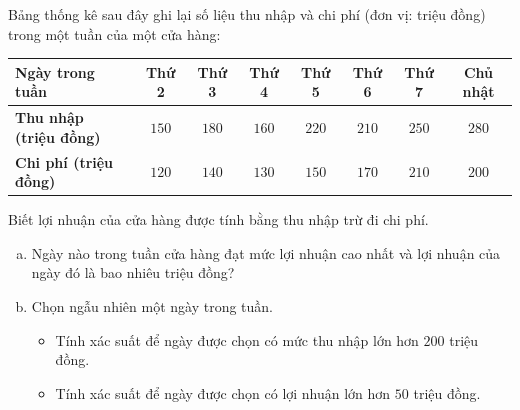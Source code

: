 \begin{bt}%
Bảng thống kê sau đây ghi lại số liệu thu nhập và chi phí (đơn vị: triệu đồng) trong một tuần của một cửa hàng:
\begin{center}
	\begin{tabular}{|l|c|c|c|c|c|c|c|}
		\hline
		\textbf{Ngày trong tuần} & \textbf{Thứ 2} & \textbf{Thứ 3} & \textbf{Thứ 4} & \textbf{Thứ 5} & \textbf{Thứ 6} & \textbf{Thứ 7} & \textbf{Chủ nhật} \\ \hline
		\textbf{Thu nhập (triệu đồng)} & $150$ & $180$ & $160$ & $220$ & $210$ & $250$ & $280$ \\ \hline
		\textbf{Chi phí (triệu đồng)} & $120$ & $140$ & $130$ & $150$ & $170$ & $210$ & $200$ \\ \hline
	\end{tabular}
\end{center}
Biết lợi nhuận của cửa hàng được tính bằng thu nhập trừ đi chi phí.
\begin{enumerate}[a)]
	\item Ngày nào trong tuần cửa hàng đạt mức lợi nhuận cao nhất và lợi nhuận của ngày đó là bao nhiêu triệu đồng?
	\item Chọn ngẫu nhiên một ngày trong tuần.
	\begin{itemize}
		\item Tính xác suất để ngày được chọn có mức thu nhập lớn hơn $200$ triệu đồng.
		\item Tính xác suất để ngày được chọn có lợi nhuận lớn hơn $50$ triệu đồng.
	\end{itemize}
\end{enumerate}
\end{bt}
